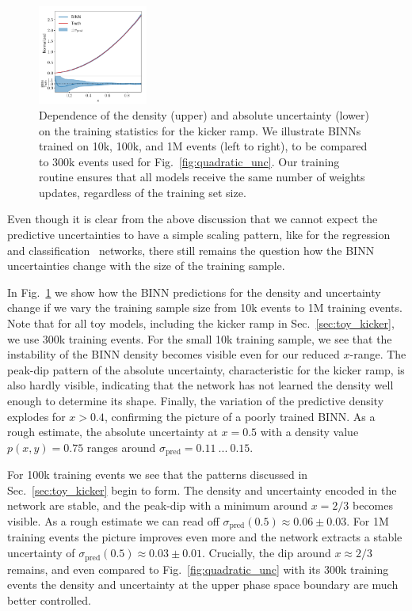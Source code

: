 \begin{figure}[t]
\includegraphics[width=0.32\textwidth, page=2]{./figures/bINN/training_size_1M}
\caption{Dependence of the density (upper) and absolute
  uncertainty (lower) on the training statistics for the kicker ramp. We illustrate BINNs trained
  on 10k, 100k, and 1M events (left to right), to be compared to 300k
  events used for Fig.~\ref{fig:quadratic_unc}. Our training routine
  ensures that all models receive the same number of weights updates,
  regardless of the training set size.}
\label{fig:training_size}
\end{figure}

Even though it is clear from the above discussion that we cannot
expect the predictive uncertainties to have a simple scaling pattern,
like for the regression~\cite{Kasieczka:2020vlh} and
classification~\cite{Bollweg:2019skg} networks, there still remains
the question how the BINN uncertainties change with the size of the
training sample.

In Fig.~\ref{fig:training_size} we show how the BINN predictions for
the density and uncertainty change if we vary the training sample size
from 10k events to 1M training events. Note that for all toy
models, including the kicker ramp in Sec.~\ref{sec:toy_kicker}, we use
300k training events. For the small 10k training sample, we see that
the instability of the BINN density becomes visible even for our
reduced $x$-range.  The peak-dip pattern of the absolute uncertainty,
characteristic for the kicker ramp, is also hardly visible, indicating
that the network has not learned the density well enough to determine
its shape. Finally, the variation of the predictive density explodes
for $x>0.4$, confirming the picture of a poorly trained BINN. As a
rough estimate, the absolute uncertainty at $x=0.5$ with a density
value $p(x,y) = 0.75$ ranges around $\sigma_\text{pred} =
0.11~...~0.15$.

For 100k training events we see that the patterns discussed in
Sec.~\ref{sec:toy_kicker} begin to form. The density and uncertainty
encoded in the network are stable, and the peak-dip with a minimum
around $x=2/3$ becomes visible. As a rough estimate we can read off
$\sigma_\text{pred}(0.5) \approx 0.06 \pm 0.03$. For 1M training
events the picture improves even more and the network extracts a
stable uncertainty of $\sigma_\text{pred}(0.5) \approx 0.03 \pm
0.01$. Crucially, the dip around $x \approx 2/3$ remains, and even
compared to Fig.~\ref{fig:quadratic_unc} with its 300k training events
the density and uncertainty at the upper phase space boundary are much
better controlled.

